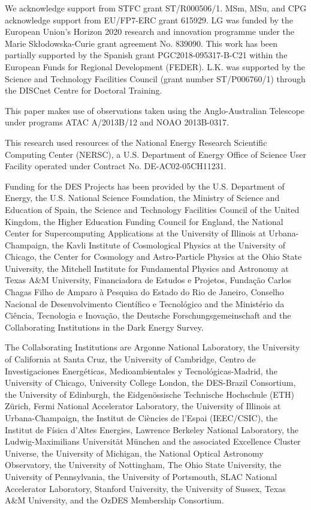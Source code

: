 \documentclass[fleqn,usenatbib,]{mnras}
\begin{document}
We acknowledge support from STFC grant ST/R000506/1. MSm, MSu, and CPG acknowledge support from EU/FP7-ERC grant 615929. LG was funded by the European Union's Horizon 2020 research and innovation programme under the Marie Sk\l{}odowska-Curie grant agreement No. 839090. This work has been partially supported by the Spanish grant PGC2018-095317-B-C21 within the European Funds for Regional Development (FEDER). L.K. was supported by the Science and Technology Facilities Council (grant number ST/P006760/1) through the DISCnet Centre for Doctoral Training.

This paper makes use of observations taken using the Anglo-Australian Telescope under programs ATAC A/2013B/12 and NOAO 2013B-0317.

This research used resources of the National Energy Research Scientific Computing Center (NERSC), a U.S. Department of Energy Office of Science User Facility operated under Contract No. DE-AC02-05CH11231.

Funding for the DES Projects has been provided by the U.S. Department of Energy, the U.S. National Science Foundation, the Ministry of Science and Education of Spain, 
the Science and Technology Facilities Council of the United Kingdom, the Higher Education Funding Council for England, the National Center for Supercomputing 
Applications at the University of Illinois at Urbana-Champaign, the Kavli Institute of Cosmological Physics at the University of Chicago, 
the Center for Cosmology and Astro-Particle Physics at the Ohio State University,
the Mitchell Institute for Fundamental Physics and Astronomy at Texas A\&M University, Financiadora de Estudos e Projetos, 
Funda{\c c}{\~a}o Carlos Chagas Filho de Amparo {\`a} Pesquisa do Estado do Rio de Janeiro, Conselho Nacional de Desenvolvimento Cient{\'i}fico e Tecnol{\'o}gico and 
the Minist{\'e}rio da Ci{\^e}ncia, Tecnologia e Inova{\c c}{\~a}o, the Deutsche Forschungsgemeinschaft and the Collaborating Institutions in the Dark Energy Survey. 

The Collaborating Institutions are Argonne National Laboratory, the University of California at Santa Cruz, the University of Cambridge, Centro de Investigaciones Energ{\'e}ticas, 
Medioambientales y Tecnol{\'o}gicas-Madrid, the University of Chicago, University College London, the DES-Brazil Consortium, the University of Edinburgh, 
the Eidgen{\"o}ssische Technische Hochschule (ETH) Z{\"u}rich, 
Fermi National Accelerator Laboratory, the University of Illinois at Urbana-Champaign, the Institut de Ci{\`e}ncies de l'Espai (IEEC/CSIC), 
the Institut de F{\'i}sica d'Altes Energies, Lawrence Berkeley National Laboratory, the Ludwig-Maximilians Universit{\"a}t M{\"u}nchen and the associated Excellence Cluster Universe, 
the University of Michigan, the National Optical Astronomy Observatory, the University of Nottingham, The Ohio State University, the University of Pennsylvania, the University of Portsmouth, 
SLAC National Accelerator Laboratory, Stanford University, the University of Sussex, Texas A\&M University, and the OzDES Membership Consortium.
\end{document}
